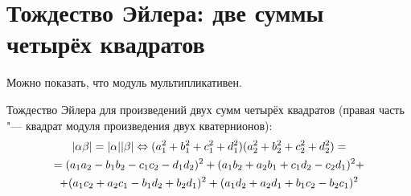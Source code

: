 \section{Тождество Эйлера: две суммы четырёх квадратов}

Можно показать, что модуль мультипликативен.

Тождество Эйлера для произведений двух сумм четырёх квадратов (правая часть "--- квадрат модуля произведения
двух кватернионов):
\begin{gather*}
|\alpha \beta| = |\alpha||\beta| \Leftrightarrow (a_1^2+b_1^2+c_1^2+d_1^2)(a_2^2+b_2^2+c_2^2+d_2^2) = \\
= (a_1a_2 - b_1b_2 - c_1c_2 - d_1d_2)^2 + (a_1b_2 + a_2b_1 + c_1d_2 - c_2d_1)^2 + \\
+ (a_1c_2 + a_2c_1 - b_1d_2 + b_2d_1)^2 + (a_1d_2 + a_2d_1 + b_1c_2 - b_2c_1)^2
\end{gather*}